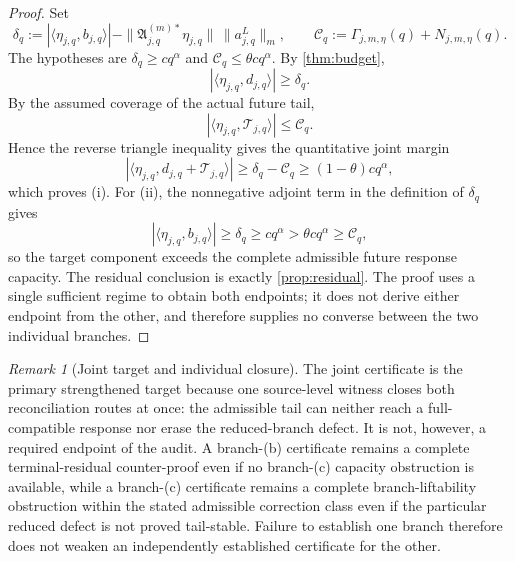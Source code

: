\documentclass[12pt]{article}
\theoremstyle{plain}
\theoremstyle{definition}
\theoremstyle{remark}
\newtheorem{remark}[theorem]{Remark}
\newcommand{\Comp}{\mathfrak A}
\newcommand{\Tail}{\mathscr T}
\begin{document}
\begin{proof}
Set
\[
\delta_q:=|\langle\eta_{j,q},b_{j,q}\rangle|
-\|\Comp_{j,q}^{(m)*}\eta_{j,q}\|\,\|a^L_{j,q}\|_m,
\qquad
\mathcal C_q:=\Gamma_{j,m,\eta}(q)+N_{j,m,\eta}(q).
\]
The hypotheses are \(\delta_q\ge cq^\alpha\) and \(\mathcal C_q\le\theta cq^\alpha\). By \cref{thm:budget},
\[
|\langle\eta_{j,q},d_{j,q}\rangle|\ge\delta_q.
\]
By the assumed coverage of the actual future tail,
\[
|\langle\eta_{j,q},\Tail_{j,q}\rangle|\le \mathcal C_q.
\]
Hence the reverse triangle inequality gives the quantitative joint margin
\[
|\langle\eta_{j,q},d_{j,q}+\Tail_{j,q}\rangle|
\ge \delta_q-\mathcal C_q
\ge (1-\theta)cq^\alpha,
\]
which proves (i). For (ii), the nonnegative adjoint term in the definition of \(\delta_q\) gives
\[
|\langle\eta_{j,q},b_{j,q}\rangle|
\ge \delta_q
\ge cq^\alpha
>\theta cq^\alpha
\ge \mathcal C_q,
\]
so the target component exceeds the complete admissible future response capacity. The residual conclusion is exactly \cref{prop:residual}. The proof uses a single sufficient regime to obtain both endpoints; it does not derive either endpoint from the other, and therefore supplies no converse between the two individual branches.
\end{proof}

\begin{remark}[Joint target and individual closure]
The joint certificate is the primary strengthened target because one source-level witness closes both reconciliation routes at once: the admissible tail can neither reach a full-compatible response nor erase the reduced-branch defect. It is not, however, a required endpoint of the audit. A branch-(b) certificate remains a complete terminal-residual counter-proof even if no branch-(c) capacity obstruction is available, while a branch-(c) certificate remains a complete branch-liftability obstruction within the stated admissible correction class even if the particular reduced defect is not proved tail-stable. Failure to establish one branch therefore does not weaken an independently established certificate for the other.
\end{remark}
\end{document}

